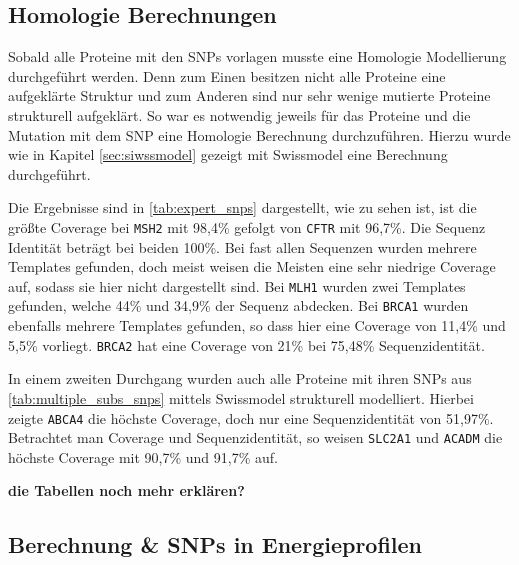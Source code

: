 \subsection{Homologie Berechnungen}

Sobald alle Proteine mit den \ac{SNPs} vorlagen musste eine Homologie Modellierung durchgeführt werden. Denn zum Einen besitzen nicht alle Proteine eine aufgeklärte Struktur und zum Anderen sind nur sehr wenige mutierte Proteine strukturell aufgeklärt. So war es notwendig jeweils für das Proteine und die Mutation mit dem \ac{SNP} eine Homologie Berechnung durchzuführen. Hierzu wurde wie in Kapitel \ref{sec:siwssmodel} gezeigt mit Swissmodel eine Berechnung durchgeführt.

Die Ergebnisse sind in \ref{tab:expert_snps} dargestellt, wie zu sehen ist, ist die größte Coverage bei \texttt{MSH2} mit 98,4\% gefolgt von \texttt{CFTR} mit 96,7\%. Die Sequenz Identität beträgt bei beiden 100\%. Bei fast allen Sequenzen wurden mehrere Templates gefunden, doch meist weisen die Meisten eine sehr niedrige Coverage auf, sodass sie hier nicht dargestellt sind. Bei \texttt{MLH1} wurden zwei Templates gefunden, welche 44\% und 34,9\% der Sequenz abdecken. Bei \texttt{BRCA1} wurden ebenfalls mehrere Templates gefunden, so dass hier eine Coverage von 11,4\% und 5,5\% vorliegt. \texttt{BRCA2} hat eine Coverage von 21\% bei 75,48\% Sequenzidentität.

In einem zweiten Durchgang wurden auch alle Proteine mit ihren SNPs aus \ref{tab:multiple_subs_snps} mittels Swissmodel strukturell modelliert. Hierbei zeigte \texttt{ABCA4} die höchste Coverage, doch nur eine Sequenzidentität von 51,97\%. Betrachtet man Coverage und Sequenzidentität, so weisen \texttt{SLC2A1} und \texttt{ACADM} die höchste Coverage mit 90,7\% und 91,7\% auf. 

\textbf{die Tabellen noch mehr erklären?}



\subsection{Berechnung \& SNPs in Energieprofilen}

